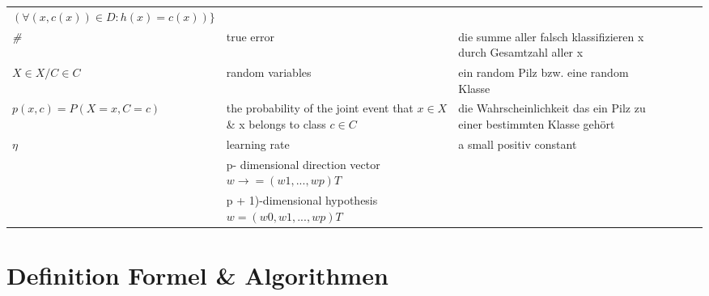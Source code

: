 \documentclass[11pt,a4paper]{article}
\begin{document}
\begin{flushleft}
\begin{table}[]
{\begin{tabular}{l p{5cm} l p{7cm} l p{7cm}}
$( \forall(x, c(x)) \in D : h(x) = c(x)) \}$ & &  \\
\textit{\#}                                                            & true error                                                                         & die summe aller falsch klassifizieren x durch Gesamtzahl aller x                                                       \\
\textit{$X \in X / C \in C$}                                                 & random variables                                                                   & ein random Pilz bzw. eine random Klasse                                                                              \\
$p(x, c) = P(X=x, C=c)$                                                  & the probability of the joint event that $x \in X$ \& x belongs to class $c \in C   $ & die Wahrscheinlichkeit das ein Pilz zu einer bestimmten Klasse gehört                                                  \\
$\eta$                                                                      & {learning rate}                                                                & a small positiv constant                                                                                              \\
                                                                       & p- dimensional direction vector $w \rightarrow = (w1, . . . , wp) T$ &                                                                                                                       \\
                                                                       & p + 1)-dimensional hypothesis $w = (w0, w1, . . . , wp) T$                                                                                                                                             & 
\end{tabular}
}
\end{table}
\section{Definition Formel \& Algorithmen}


\end{flushleft}
\end{document}
